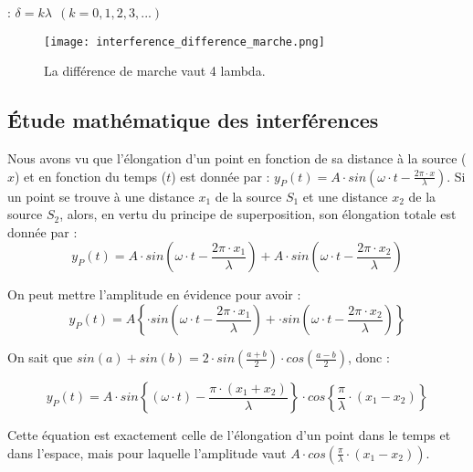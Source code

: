 \begin{encadre}
     : \(\delta = k \lambda \ \ (k=0,1,2,3,...)\)
\end{encadre}

\newpage

\begin{figure}[ht!]
    \centering
    \texttt{[image: interference\_difference\_marche.png]}
    \caption{La différence de marche vaut 4 lambda.}
\end{figure}

\newpage

\subsection{Étude mathématique des interférences}
Nous avons vu que l'élongation d'un point en fonction de sa distance à la source (\(x\)) et en fonction du temps (\(t\)) est donnée par : \(y_P (t) = A \cdot sin (\omega \cdot t- \frac{2 \pi  \cdot x}{\lambda})\).
Si un point se trouve à une distance \(x_1\) de la source \(S_1\) et une distance \(x_2\) de la source \(S_2\), alors, en vertu du principe de superposition, son élongation totale est donnée par :
\begin{equation}
    y_P (t) = A \cdot sin (\omega \cdot t- \frac{2 \pi  \cdot x_1}{\lambda}) + A \cdot sin (\omega \cdot t- \frac{2 \pi  \cdot x_2}{\lambda})
\end{equation}

On peut mettre l'amplitude en évidence pour avoir :
\begin{equation}
    y_P (t) = A \left \lbrace \cdot sin (\omega  \cdot t- \frac{2 \pi  \cdot x_1}{\lambda}) +  \cdot sin (\omega \cdot t- \frac{2 \pi  \cdot x_2}{\lambda}) \right \rbrace
\end{equation}

On sait que \(sin( a) + sin (b)=2 \cdot sin( \frac{a+b}{2}) \cdot cos(\frac{a-b}{2})\), donc :

\begin{equation}
    y_P (t) = A \cdot  sin \left \lbrace (\omega  \cdot t)- \frac{ \pi  \cdot (x_1+x_2)}{\lambda} \right \rbrace   \cdot cos \left \lbrace \frac{\pi}{\lambda}\cdot (x_1-x_2) \right \rbrace
\end{equation}

Cette équation est exactement celle de l'élongation d'un point dans le temps et dans l'espace, mais pour laquelle l'amplitude vaut \(A \cdot cos (\frac{\pi}{\lambda}\cdot (x_1-x_2) )\).

